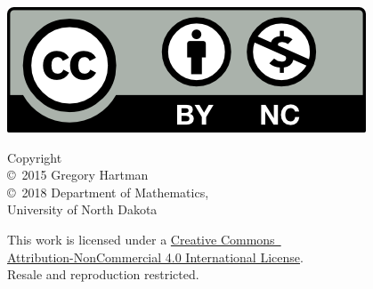 
\noindent\hspace{-1in}\begin{minipage}{2in}
\href{http://creativecommons.org/licenses/by-nc/4.0/}{\includegraphics{figures/by-nc}}
\end{minipage}%
\begin{minipage}{3in}\raggedright
\noindent Copyright\\
\copyright~2015 Gregory Hartman\\
\copyright~2018 Department of Mathematics,\\
University of North Dakota

This work is licensed under a \href{http://creativecommons.org/licenses/by-nc/4.0/}{Creative Commons\iflatexml\ \else\\\fi Attribution-NonCommercial 4.0 International License}.\\
Resale and reproduction restricted.
\end{minipage}

